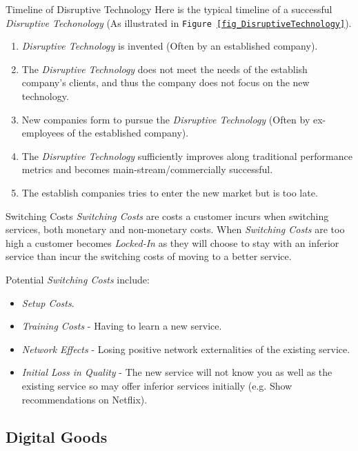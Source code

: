 \documentclass[11pt,a4paper]{article}
\begin{document}
  \begin{remark}{Timeline of Disruptive Technology}
    Here is the typical timeline of a successful \textit{Disruptive Techonology} (As illustrated in \texttt{Figure \ref{fig_DisruptiveTechnology}}).
    \begin{enumerate}
      \item \textit{Disruptive Technology} is invented (Often by an established company).
      \item The \textit{Disruptive Technology} does not meet the needs of the establish company's clients, and thus the company does not focus on the new technology.
      \item New companies form to pursue the \textit{Disruptive Technology} (Often by ex-employees of the established company).
      \item The \textit{Disruptive Technology} sufficiently improves along traditional performance metrics and becomes main-stream/commercially successful.
      \item The establish companies tries to enter the new market but is too late.
    \end{enumerate}
  \end{remark}

  \begin{definition}{Switching Costs}
    \textit{Switching Costs} are costs a customer incurs when switching services, both monetary and non-monetary costs. When \textit{Switching Costs} are too high a customer becomes \textit{Locked-In} as they will choose to stay with an inferior service than incur the switching costs of moving to a better service.
    \par Potential \textit{Switching Costs} include:
    \begin{itemize}
      \item \textit{Setup Costs}.
      \item \textit{Training Costs} - Having to learn a new service.
      \item \textit{Network Effects} - Losing positive network externalities of the existing service.
      \item \textit{Initial Loss in Quality} - The new service will not know you as well as the existing service so may offer inferior services initially (e.g. Show recommendations on Netflix).
    \end{itemize}
  \end{definition}

\subsection{Digital Goods} \label{sec_DigitalGoods}
\end{document}
